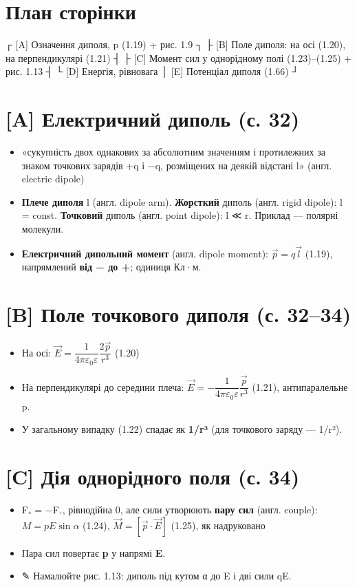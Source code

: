 \documentclass[11pt,a4paper,oneside]{book}
\newcommand{\pen}{{\sffamily\color{accent}✎}}
\begin{document}
\section*{План сторінки}
\begin{layout}
┌ [A] Означення диполя, p (1.19) + рис. 1.9  ┐
├ [B] Поле диполя: на осі (1.20), на перпендикулярі (1.21) ┤
├ [C] Момент сил у однорідному полі (1.23)–(1.25) + рис. 1.13 ┤
└ [D] Енергія, рівновага  │ [E] Потенціал диполя (1.66)       ┘
\end{layout}

\section*{[A] Електричний диполь (с. 32)}
\begin{itemize}
\item «сукупність двох однакових за абсолютним значенням і протилежних за знаком точкових зарядів +q і −q, розміщених на деякій відстані l» (англ. electric dipole)
\item \textbf{Плече диполя} l (англ. dipole arm). \textbf{Жорсткий} диполь (англ. rigid dipole): l = const. \textbf{Точковий} диполь (англ. point dipole): l ≪ r. Приклад — полярні молекули.
\item \textbf{Електричний дипольний момент} (англ. dipole moment): $\vec p = q\vec l$ (1.19), напрямлений \textbf{від − до +}; одиниця Кл·м.
\end{itemize}

\section*{[B] Поле точкового диполя (с. 32–34)}
\begin{itemize}
\item На осі: $\vec E = \dfrac{1}{4\pi\varepsilon_0\varepsilon}\dfrac{2\vec p}{r^3}$ (1.20)
\item На перпендикулярі до середини плеча: $\vec E = -\dfrac{1}{4\pi\varepsilon_0\varepsilon}\dfrac{\vec p}{r^3}$ (1.21), антипаралельне p.
\item У загальному випадку (1.22) спадає як \textbf{1/r³} (для точкового заряду — 1/r²).
\end{itemize}

\section*{[C] Дія однорідного поля (с. 34)}
\begin{itemize}
\item F₊ = −F₋, рівнодійна 0, але сили утворюють \textbf{пару сил} (англ. couple):
$M = pE\sin\alpha$ (1.24), $\vec M = [\vec p\cdot\vec E]$ (1.25), як надруковано
\item Пара сил повертає \textbf{p} у напрямі \textbf{E}.
\item \pen{} Намалюйте рис. 1.13: диполь під кутом α до E і дві сили qE.
\end{itemize}
\end{document}

